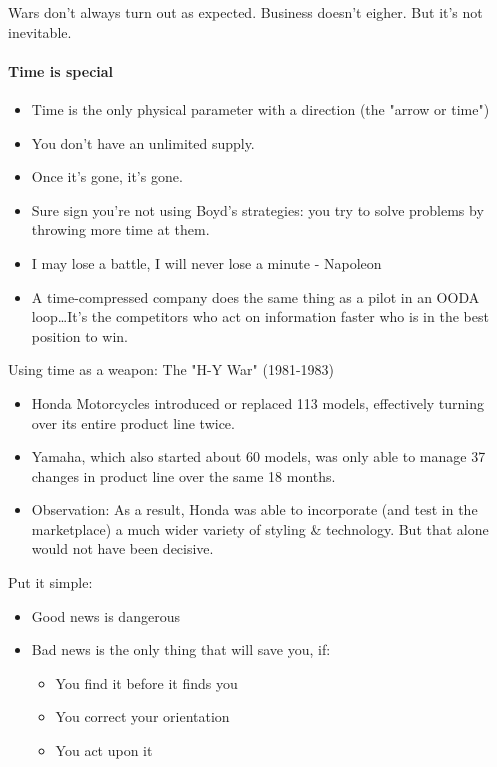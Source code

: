 Wars don't always turn out as expected. Business doesn't eigher. But it's not
inevitable.

\paragraph{Time is special}

\begin{itemize}
    \item Time is the only physical parameter with a direction (the "arrow
        or time")
    \item You don't have an unlimited supply.
    \item Once it's gone, it's gone.
    \item Sure sign you're not using Boyd's strategies: you try to solve problems
        by throwing more time at them.
    \item I may lose a battle, I will never lose a minute - Napoleon
    \item A time-compressed company does the same thing as a pilot in an OODA
        loop\dots It's the competitors who act on information faster who is in
        the best position to win.
\end{itemize}

Using time as a weapon: The "H-Y War" (1981-1983)
\begin{itemize}
    \item Honda Motorcycles introduced or replaced 113 models, effectively
        turning over its entire product line twice.
    \item Yamaha, which also started about 60 models, was only able to manage
        37 changes in product line over the same 18 months.
    \item Observation: As a result, Honda was able to incorporate (and test
        in the marketplace) a much wider variety of styling \& technology. But
        that alone would not have been decisive.
\end{itemize}

Put it simple:
\begin{itemize}
    \item Good news is dangerous
    \item Bad news is the only thing that will save you, if:
        \begin{itemize}
            \item You find it before it finds you
            \item You correct your orientation
            \item You act upon it
        \end{itemize}
\end{itemize}

